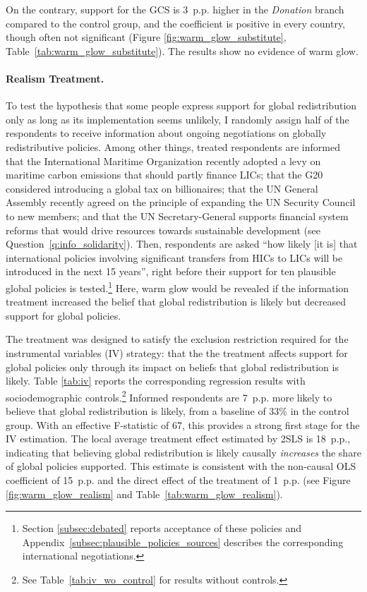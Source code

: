 \documentclass[12pt,english]{article}
\begin{document}
\begin{bibunit}
On the contrary, support for the GCS is 3~p.p. higher in the \textit{Donation} branch compared to the control group, and the coefficient is positive in every country, though often not significant (Figure \ref{fig:warm_glow_substitute}, Table~\ref{tab:warm_glow_substitute}).
The results show no evidence of warm glow.

\paragraph{Realism Treatment.}

To test the hypothesis that some people express support for global redistribution only as long as its implementation seems unlikely, I randomly assign half of the respondents to receive information about ongoing negotiations on globally redistributive policies. Among other things, treated respondents are informed that the International Maritime Organization recently adopted a levy on maritime carbon emissions that should partly finance LICs; that the G20 considered introducing a global tax on billionaires; that the UN General Assembly recently agreed on the principle of expanding the UN Security Council to new members; and that the UN Secretary-General supports financial system reforms that would drive resources towards sustainable development (see Question~\ref{q:info_solidarity}).
Then, respondents are asked ``how likely [it is] that international policies involving significant transfers from HICs to LICs will be introduced in the next 15 years'', right before their support for ten plausible global policies is tested.\footnote{Section \ref{subsec:debated} reports acceptance of these policies and Appendix~\ref{subsec:plausible_policies_sources} describes the corresponding international negotiations.}  Here, warm glow would be revealed if the information treatment increased the belief that global redistribution is likely but decreased support for global policies.

The treatment was designed to satisfy the exclusion restriction required for the instrumental variables (IV) strategy: that the the treatment affects support for global policies only through its impact on beliefs that global redistribution is likely. Table \ref{tab:iv} reports the corresponding regression results with sociodemographic controls.\footnote{See Table~\ref{tab:iv_wo_control} for results without controls.}
Informed respondents are 7~p.p. more likely to believe that global redistribution is likely, from a baseline of 33\% in the control group. With an effective F-statistic of 67, this provides a strong first stage for the IV estimation. %
The local average treatment effect estimated by 2SLS is 18~p.p., indicating that believing global redistribution is likely causally \textit{increases} the share of global policies supported. This estimate is consistent with the non-causal OLS coefficient of 15~p.p. and the direct effect of the treatment of 1~p.p. (see Figure \ref{fig:warm_glow_realism} and Table~\ref{tab:warm_glow_realism}).


\end{bibunit}
\end{document}
